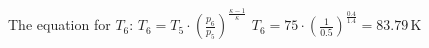 The equation for \( T_6 \):  
\( T_6 = T_5 \cdot \left( \frac{p_6}{p_5} \right)^{\frac{\kappa - 1}{\kappa}} \)  
\( T_6 = 75 \cdot \left( \frac{1}{0.5} \right)^{\frac{0.4}{1.4}} = 83.79 \, \text{K} \)